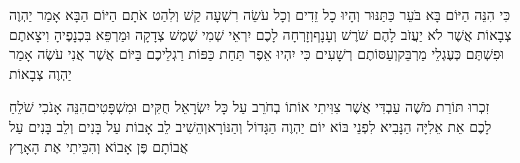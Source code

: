 \documentclass[../main/main.tex]{subfiles}
\begin{document}
\begin{multicols*}{\ncols}
כִּי הִנֵּה הַיּוֹם בָּא בֹּעֵר כַּתַּנּוּר וְהָיוּ כָל זֵדִים וְכָל עֹשֵׂה רִשְׁעָה קַשׁ וְלִהַט אֹתָם הַיּוֹם הַבָּא אָמַר יַהְוֶה צְבָאוֹת אֲשֶׁר לֹא יַעֲזֹב לָהֶם שֹׁרֶשׁ וְעָנָף\PreVerseSpace{}וְזָרְחָה לָכֶם יִרְאֵי שְׁמִי שֶׁמֶשׁ צְדָקָה וּמַרְפֵּא בִּכְנָפֶיהָ וִיצָאתֶם וּפִשְׁתֶּם כְּעֶגְלֵי מַרְבֵּק\PreVerseSpace{}וְעַסּוֹתֶם רְשָׁעִים כִּי יִהְיוּ אֵפֶר תַּחַת כַּפּוֹת רַגְלֵיכֶם בַּיּוֹם אֲשֶׁר אֲנִי עֹשֶׂה אָמַר יַהְוֶה צְבָאוֹת\OpenSection{}\par
{}זִכְרוּ תּוֹרַת מֹשֶׁה עַבְדִּי אֲשֶׁר צִוִּיתִי אוֹתוֹ בְחֹרֵב עַל כָּל יִשְׂרָאֵל חֻקִּים וּמִשְׁפָּטִים\PreVerseSpace{}הִנֵּה אָנֹכִי שֹׁלֵחַ לָכֶם אֵת אֵלִיָּה הַנָּבִיא לִפְנֵי בּוֹא יוֹם יַהְוֶה הַגָּדוֹל וְהַנּוֹרָא\PreVerseSpace{}וְהֵשִׁיב לֵב אָבוֹת עַל בָּנִים וְלֵב בָּנִים עַל אֲבוֹתָם פֶּן אָבוֹא וְהִכֵּיתִי אֶת הָאָרֶץ\par
\end{multicols*}
\end{document}
